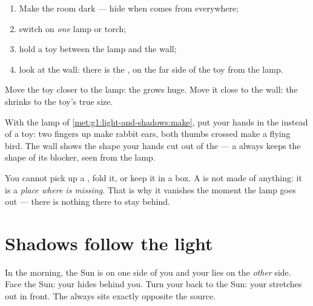 \begin{method}\label{met:g1:light-and-shadows:make}
\begin{enumerate}
  \item Make the room dark ---  hide when  comes from
        everywhere;
  \item switch on \emph{one} lamp or torch;
  \item hold a toy between the lamp and the wall;
  \item look at the wall: there is the , on the far side of the
        toy from the lamp.
\end{enumerate}
Move the toy closer to the lamp: the  grows huge. Move it
close to the wall: the  shrinks to the toy's true size.
\end{method}

\begin{example}\label{ex:g1:light-and-shadows:animals}
With the lamp of \cref{met:g1:light-and-shadows:make}, put your hands
in the  instead of a toy: two fingers up make rabbit ears, both
thumbs crossed make a flying bird. The wall shows the shape your
hands cut out of the  --- a  always keeps the shape of its
blocker, seen from the lamp.
\end{example}

\begin{remark}\label{rem:g1:light-and-shadows:notathing}
You cannot pick up a , fold it, or keep it in a box. A 
is not made of anything: it is a \emph{place where  is
missing}. That is why it vanishes the moment the lamp goes out ---
there is nothing there to stay behind.
\end{remark}

\section{Shadows follow the light}

\begin{example}\label{ex:g1:light-and-shadows:opposite}
In the morning, the Sun is on one side of you and your  lies on
the \emph{other} side. Face the Sun: your  hides behind you.
Turn your back to the Sun: your  stretches out in front. The
 always sits exactly opposite the source.
\end{example}

